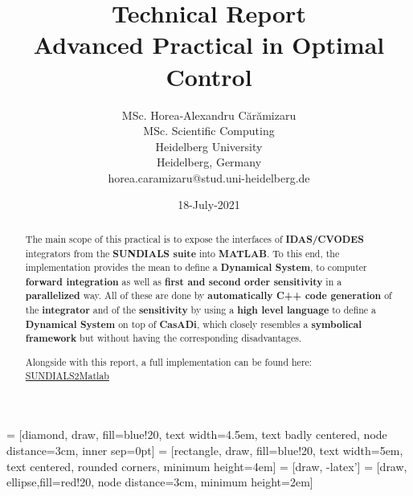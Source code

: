 \documentclass[12pt, letterpaper]{article}
\begin{document}
 = [diamond, draw, fill=blue!20, 
    text width=4.5em, text badly centered, node distance=3cm, inner sep=0pt]
 = [rectangle, draw, fill=blue!20, 
    text width=5em, text centered, rounded corners, minimum height=4em]
 = [draw, -latex']
 = [draw, ellipse,fill=red!20, node distance=3cm,
    minimum height=2em]


\title{Technical Report \\  Advanced Practical in Optimal Control }



\author{MSc. Horea-Alexandru C\u{a}r\u{a}mizaru \\
MSc. Scientific Computing\\
Heidelberg University \\
Heidelberg, Germany \\
horea.caramizaru@stud.uni-heidelberg.de
}
\date{18-July-2021}


\maketitle

\begin{abstract}

The main scope of this practical is to expose the interfaces of \textbf{IDAS/CVODES} integrators from the \textbf{SUNDIALS suite} \cite{hindmarsh2005sundials} into \textbf{MATLAB}. To this end, the implementation provides the mean to define a \textbf{Dynamical System}, to computer \textbf{forward integration} as well as \textbf{first and second order sensitivity} in a \textbf{ parallelized} way. All of these are done by \textbf{automatically C++ code generation} of the \textbf{integrator} and of the \textbf{sensitivity} by using a \textbf{high level language} to define a \textbf{Dynamical System} on top of \textbf{CasADi}, which closely resembles a \textbf{symbolical framework} but without having the corresponding disadvantages.

Alongside with this report, a full implementation can be found here: \href{https://github.com/nashmit/SUNDIALS2Matlab}{SUNDIALS2Matlab}

\end{abstract}
\end{document}
